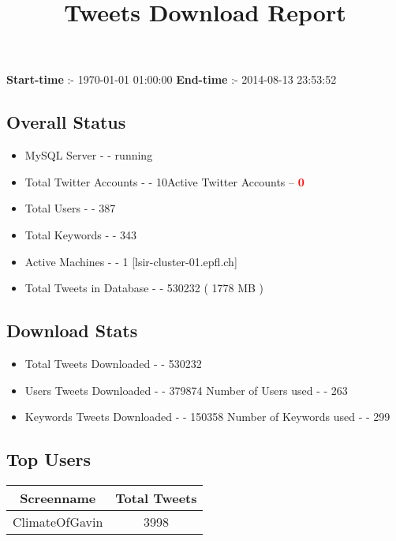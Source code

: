 \documentclass{article}\usepackage[T1]{fontenc}
\begin{document}
\title{\textbf{Tweets Download Report}}
               \date{}
                \maketitle
               \centerline{\textbf{Start-time} :- 1970-01-01 01:00:00 \hspace{40pt} \textbf{End-time} :- 2014-08-13 23:53:52}               \subsection*{Overall Status}                \begin{itemize}                \item MySQL Server - - running               \item Total Twitter Accounts - - 10\newline Active Twitter Accounts -- \textcolor{red}{\textbf{0}}               \item Total Users - - 387               \item Total Keywords - - 343               \item Active Machines - - 1 [lsir-cluster-01.epfl.ch]               \item Total Tweets in Database - - 530232 ( 1778 MB )               \end{itemize}               \subsection*{Download Stats}                \begin{itemize}                \item Total Tweets Downloaded - - 530232               \item Users Tweets Downloaded - - 379874 \newline Number of Users used - - 263               \item Keywords Tweets Downloaded - - 150358 \newline Number of Keywords used - - 299              \end{itemize}              \subsection*{Top Users}\begin{tabular}{|c|c|}         \hline         Screenname & Total Tweets \\ 
 \hline
ClimateOfGavin & 3998\\ 

\end{tabular}
\end{document}

